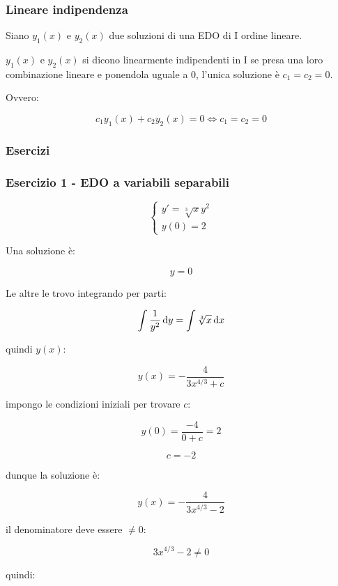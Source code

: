 \pagebreak{}

\subsubsection{Lineare indipendenza}

Siano \(y_1(x)\) e \(y_2(x)\) due soluzioni di una EDO di I ordine lineare.

\(y_1(x)\) e \(y_2(x)\) si dicono linearmente indipendenti in I se presa una loro combinazione lineare e ponendola uguale a 0, l'unica soluzione è \(c_1=c_2=0\).

Ovvero:

\[
    c_1y_1(x) +c_2y_2(x) = 0 \iff c_1=c_2=0
\]

\pagebreak
\subsubsection{Esercizi}

\subsubsection*{Esercizio 1 {-} EDO a variabili separabili}

\begin{equation*}
    \begin{cases}
        y'=\sqrt[3]{x}y^{2} \\
        y(0) = 2
    \end{cases}
\end{equation*}

Una soluzione è:

\[
    y=0
\]

Le altre le trovo integrando per parti:

\[
    \int \frac{1}{y^{2}} \mathop{}\!\mathrm{d} y = \int \sqrt[3]{x} \mathop{}\!\mathrm{d} x
\]

quindi \(y(x)\):

\[
    y(x)  = - \frac{4}{3 x^{4/3} +c}
\]

impongo le condizioni iniziali per trovare \(c\):

\[
    y(0) = \frac{-4}{0+c} = 2
\]

\[
    c = -2
\]

dunque la soluzione è:

\[
    y(x) = -\frac{4}{3 x^{4/3} - 2}
\]

il denominatore deve essere \(\neq 0\):

\[
    3 x^{4/3} - 2 \neq 0
\]

quindi:

